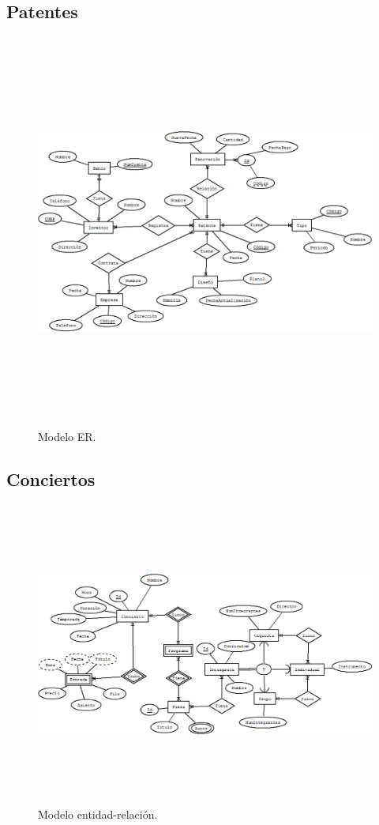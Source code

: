 \documentclass[12pt, titlepage]{article}
\begin{document}
	\subsection{Patentes}
	\begin{figure}[H]
		\begin{center}
			\includegraphics[width=16cm, height=13cm]{img/Patentes.png}
			\caption{Modelo ER.}
			\label{fig:hasta-3}
		\end{center}
	\end{figure}
	\subsection{Conciertos}
	\begin{figure}[H]
		\begin{center}
			\includegraphics[width=16cm, height=10cm]{img/Conciertos.png}
			\caption{Modelo entidad-relación.}
			\label{fig:hastause3}
		\end{center}
	\end{figure}
\end{document}
